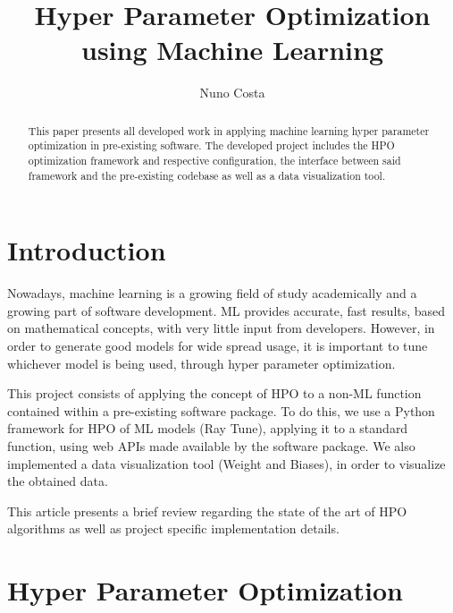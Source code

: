 \documentclass[runningheads]{llncs}
\begin{document}
\title{Hyper Parameter Optimization\\using Machine Learning}

\author{Nuno Costa}


\maketitle

\begin{abstract}

This paper presents all developed work in applying machine learning hyper parameter optimization in pre-existing software. The developed project includes the HPO optimization framework and respective configuration, the interface between said framework and the pre-existing codebase as well as a data visualization tool. 


\end{abstract}

\section{Introduction}

Nowadays, machine learning is a growing field of study academically and a growing part of software development. ML provides accurate, fast results, based on mathematical concepts, with very little input from developers. However, in order to generate good models for wide spread usage, it is important to tune whichever model is being used, through hyper parameter optimization.

This project consists of applying the concept of HPO to a non-ML function contained within a pre-existing software package. To do this, we use a Python framework for HPO of ML models (Ray Tune), applying it to a standard function, using web APIs made available by the software package. We also implemented a data visualization tool (Weight and Biases), in order to visualize the obtained data.

This article presents a brief review regarding the state of the art of HPO algorithms as well as project specific implementation details.

\section{Hyper Parameter Optimization}
\end{document}

